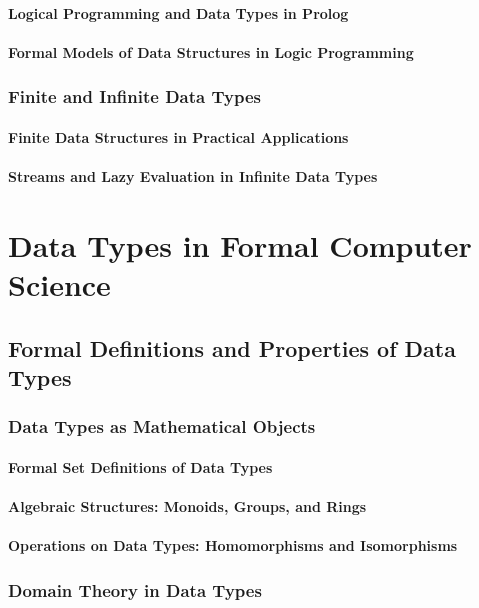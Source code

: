 \documentclass[12pt, oneside]{book}
\begin{document}
\subsubsection{Logical Programming and Data Types in Prolog}
\subsubsection{Formal Models of Data Structures in Logic Programming}
\subsection{Finite and Infinite Data Types}
\subsubsection{Finite Data Structures in Practical Applications}
\subsubsection{Streams and Lazy Evaluation in Infinite Data Types}

\chapter{Data Types in Formal Computer Science}
\section{Formal Definitions and Properties of Data Types}
\subsection{Data Types as Mathematical Objects}
\subsubsection{Formal Set Definitions of Data Types}
\subsubsection{Algebraic Structures: Monoids, Groups, and Rings}
\subsubsection{Operations on Data Types: Homomorphisms and Isomorphisms}
\subsection{Domain Theory in Data Types}
\end{document}
